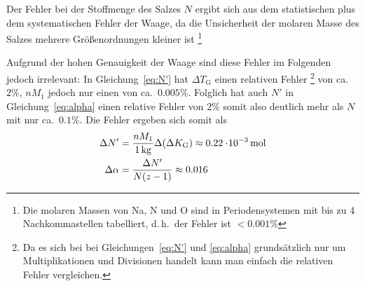 Der Fehler bei der Stoffmenge des Salzes $N$ ergibt sich aus dem statistischen plus dem systematischen Fehler der Waage, da die Unsicherheit der molaren Masse des Salzes mehrere Größenordnungen kleiner ist%
\footnote{Die molaren Massen von Na, N und O sind in Periodensystemen mit bis zu 4 Nachkommastellen tabelliert, d.\,h.\ der Fehler ist $<0.001\%$}%

Aufgrund der hohen Genauigkeit der Waage sind diese Fehler im Folgenden jedoch irrelevant: 
%
%
In Gleichung~\ref{eq:N'} hat $\Delta T_\mathrm{G}$ einen relativen Fehler%
\footnote{Da es sich bei bei Gleichungen~\ref{eq:N'} und \ref{eq:alpha} grundsätzlich nur um Multiplikationen und Divisionen handelt kann man einfach die relativen Fehler vergleichen.}
von ca.\ $2\%$, $n M_1$ jedoch nur einen von ca.\ $0.005\%$. Folglich hat auch $N'$ in Gleichung~\ref{eq:alpha} einen relative Fehler von $2\%$ somit also deutlich mehr als $N$ mit nur ca.\ $0.1\%$. Die Fehler ergeben sich somit als
%
\begin{align*}
        \stat N' &= \frac{n M_1}{\unit[1]{kg}} \stat(\Delta K_\mathrm{G}) \approx \unit[0.22\cdot\! 10^{-3}]{mol} \\
    \stat \alpha &= \frac{\stat N'}{N (z-1)} \approx 0.016
\end{align*}
%






